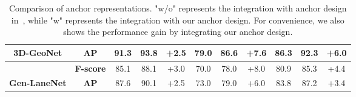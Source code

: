 \documentclass[10pt,twocolumn,letterpaper]{article}
\begin{document}
\begin{table*}[]
\begin{tabular}{|c|c|c|c|c|c|c|c|c|c|c|}
\multirow{-2}{*}{\textbf{3D-GeoNet}}                           & \textbf{AP}                             & 91.3                 & 93.8                 & {\color[HTML]{FE0000} +2.5}                & 79.0                   & 86.6                   & {\color[HTML]{FE0000} +7.6}                   & 86.3                     & 92.3                     & {\color[HTML]{FE0000} +6.0}                      \\ \hline
                                                               & \textbf{F-score}                        & 85.1                 & 88.1                 & {\color[HTML]{FE0000} +3.0}                & 70.0                   & 78.0                   & {\color[HTML]{FE0000} +8.0}                   & 80.9                     & 85.3                     & {\color[HTML]{FE0000} +4.4}                      \\ \cline{2-11} 
\multirow{-2}{*}{\textbf{Gen-LaneNet}}                         & \textbf{AP}                             & 87.6                 & 90.1                 & {\color[HTML]{FE0000} +2.5}                & 73.0                   & 79.0                   & {\color[HTML]{FE0000} +6.0}                   & 83.8                     & 87.2                     & {\color[HTML]{FE0000} +3.4}                      \\ \hline
\end{tabular}
\caption{Comparison of anchor representations. "w/o" represents the integration with anchor design in~\cite{Garnett:etal:ICCV2019}, while "w" represents the integration with our anchor design. For convenience, we also shows the performance gain by integrating our anchor design.}
\label{tab:anchor:compare}
\end{table*}
\end{document}
